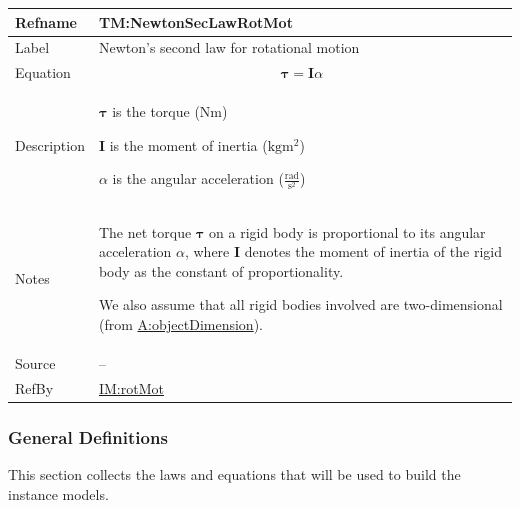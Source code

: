 \documentclass[12pt]{article}
\begin{document}
\medskip
\noindent
\begin{minipage}{\textwidth}
\begin{tabular}{>{\raggedright}p{}>{\raggedright\arraybackslash}p{}}
\toprule \textbf{Refname} & \textbf{TM:NewtonSecLawRotMot}
\label{TM:NewtonSecLawRotMot}
\\ \midrule
Label & Newton's second law for rotational motion
        
\\ \midrule
Equation & \begin{displaymath}
           \symbf{τ}=\symbf{I} α
           \end{displaymath}
\\ \midrule
Description & \begin{symbDescription}
              \item{$\symbf{τ}$ is the torque ($\text{N}\text{m}$)}
              \item{$\symbf{I}$ is the moment of inertia ($\text{kg}\text{m}^{2}$)}
              \item{$α$ is the angular acceleration ($\frac{\text{rad}}{\text{s}^{2}}$)}
              \end{symbDescription}
\\ \midrule
Notes & The net torque $\symbf{τ}$ on a rigid body is proportional to its angular acceleration $α$, where $\symbf{I}$ denotes the moment of inertia of the rigid body as the constant of proportionality.
        
        We also assume that all rigid bodies involved are two-dimensional (from \hyperref[assumpOD]{A:objectDimension}).
        
\\ \midrule
Source & --
         
\\ \midrule
RefBy & \hyperref[IM:rotMot]{IM:rotMot}
        
\\ \bottomrule
\end{tabular}
\end{minipage}

\subsubsection{General Definitions}
\label{Sec:GDs}
This section collects the laws and equations that will be used to build the instance models.
\end{document}
